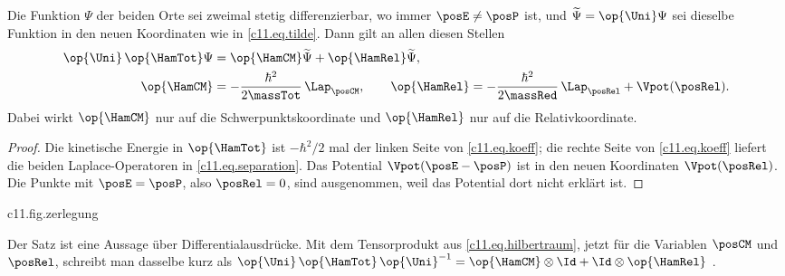\begin{theorem}\label{c11.thm.separation}
  Die Funktion $\Psi$ der beiden Orte sei zweimal stetig differenzierbar, wo immer
  $\posE \neq \posP$ ist, und $\widetilde{\Psi} = \op{\Uni}\Psi$ sei dieselbe Funktion in den
  neuen Koordinaten wie in \eqref{c11.eq.tilde}. Dann gilt an allen diesen Stellen
  \begin{equation}\label{c11.eq.separation}
    \begin{aligned}
      \op{\Uni}\,\op{\HamTot}\Psi &= \op{\HamCM}\widetilde{\Psi} + \op{\HamRel}\widetilde{\Psi}, \\
      \op{\HamCM} &= -\frac{\hbar^2}{2\massTot}\,\Lap_{\posCM},
      \qquad
      \op{\HamRel} = -\frac{\hbar^2}{2\massRed}\,\Lap_{\posRel} + \Vpot(\posRel).
    \end{aligned}
  \end{equation}
  Dabei wirkt $\op{\HamCM}$ nur auf die Schwerpunktskoordinate und $\op{\HamRel}$ nur auf die
  Relativkoordinate.
\end{theorem}
\begin{proof}
  Die kinetische Energie in $\op{\HamTot}$ ist $-\hbar^2/2$ mal der linken Seite von
  \eqref{c11.eq.koeff}; die rechte Seite von \eqref{c11.eq.koeff} liefert die beiden
  Laplace-Operatoren in \eqref{c11.eq.separation}. Das Potential
  $\Vpot(\posE - \posP)$ ist in den neuen Koordinaten $\Vpot(\posRel)$. Die Punkte mit
  $\posE = \posP$, also $\posRel = 0$, sind ausgenommen, weil das Potential dort nicht
  erklärt ist.
\end{proof}

\begin{tpcfigure}{c11.fig.zerlegung}
  \caption{Theorem~\ref{c11.thm.separation} als Schema; die Längen im Bild bedeuten nichts. Links das Atom, wie es dasteht: zwei Teilchen, gekoppelt durch das Potential. Rechts dasselbe System in den neuen Koordinaten: ein freies Teilchen der Masse $\massTot$ und, unabhängig davon, ein Teilchen der Masse $\massRed$ im Potential $\Vpot$.}
\end{tpcfigure}

Der Satz ist eine Aussage über Differentialausdrücke. Mit dem Tensorprodukt aus
\eqref{c11.eq.hilbertraum}, jetzt für die Variablen $\posCM$ und $\posRel$, schreibt man
dasselbe kurz als $\op{\Uni}\,\op{\HamTot}\,\op{\Uni}^{-1} = \op{\HamCM} \otimes \Id + \Id \otimes \op{\HamRel}$
.

